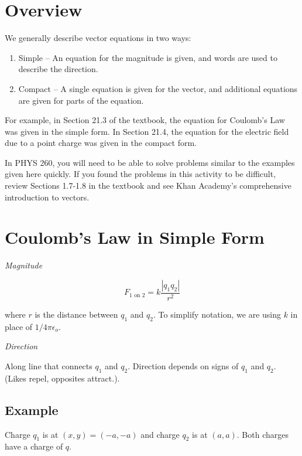\documentclass{article}
\renewcommand{\mbox}{\text}
\begin{document}
\section{Overview}

We generally describe vector equations in two ways:

\begin{enumerate}

  \item Simple -- An equation for the magnitude is given, and words are used to describe the direction.

  \item Compact -- A single equation is given for the vector, and additional equations are given for parts of the equation.

\end{enumerate}

For example, in Section 21.3 of the textbook, the equation for Coulomb's Law was given in the simple form. In Section 21.4, the equation for the electric field due to a point charge was given in the compact form.

In PHYS 260, you will need to be able to solve problems similar to the examples given here quickly. If you found the problems in this activity to be difficult, review Sections 1.7-1.8 in the textbook and see Khan Academy's comprehensive introduction to vectors.

\section{Coulomb's Law in Simple Form}

\emph{Magnitude}

\begin{equation}
F_{1\mbox{ on } 2}=k\frac{|q_1q_2|}{r^2}
\end{equation}

where $r$ is the distance between $q_1$ and $q_2$. To simplify notation, we are using $k$ in place of $1/4\pi\epsilon_o$.

\emph{Direction}

Along line that connects $q_1$ and $q_2$. Direction depends on signs of $q_1$ and $q_2$. (Likes repel, opposites attract.).

\subsection{Example}

Charge $q_1$ is at $(x,y)=(-a,-a)$ and charge $q_2$ is at $(a, a)$. Both charges have a charge of $q$.
\end{document}
